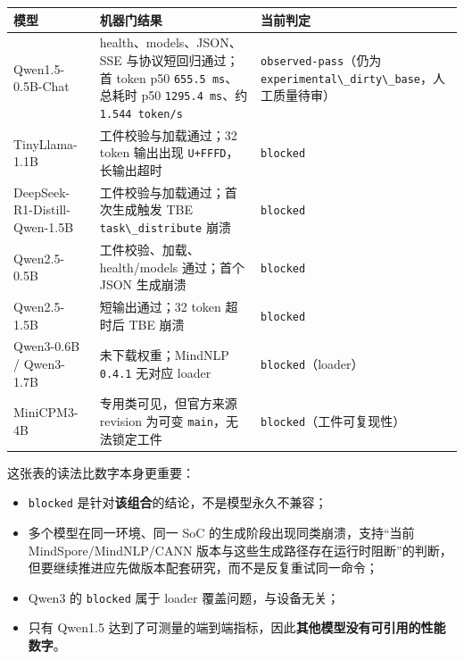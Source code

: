 \begin{longtable}[]{@{}
  >{\raggedright\arraybackslash}p{}
  >{\raggedright\arraybackslash}p{}
  >{\raggedright\arraybackslash}p{}@{}}
\toprule\noalign{}
\begin{minipage}[b]{\linewidth}\raggedright
模型
\end{minipage} & \begin{minipage}[b]{\linewidth}\raggedright
机器门结果
\end{minipage} & \begin{minipage}[b]{\linewidth}\raggedright
当前判定
\end{minipage} \\
\midrule\noalign{}
\endhead
\bottomrule\noalign{}
\endlastfoot
Qwen1.5-0.5B-Chat & health、models、JSON、SSE 与协议短回归通过；首 token
p50 \passthrough{\lstinline!655.5 ms!}、总耗时 p50
\passthrough{\lstinline!1295.4 ms!}、约
\passthrough{\lstinline!1.544 token/s!} &
\passthrough{\lstinline!observed-pass!}（仍为
\passthrough{\lstinline!experimental\_dirty\_base!}，人工质量待审） \\
TinyLlama-1.1B & 工件校验与加载通过；32 token 输出出现
\passthrough{\lstinline!U+FFFD!}，长输出超时 &
\passthrough{\lstinline!blocked!} \\
DeepSeek-R1-Distill-Qwen-1.5B & 工件校验与加载通过；首次生成触发 TBE
\passthrough{\lstinline!task\_distribute!} 崩溃 &
\passthrough{\lstinline!blocked!} \\
Qwen2.5-0.5B & 工件校验、加载、health/models 通过；首个 JSON 生成崩溃 &
\passthrough{\lstinline!blocked!} \\
Qwen2.5-1.5B & 短输出通过；32 token 超时后 TBE 崩溃 &
\passthrough{\lstinline!blocked!} \\
Qwen3-0.6B / Qwen3-1.7B & 未下载权重；MindNLP
\passthrough{\lstinline!0.4.1!} 无对应 loader &
\passthrough{\lstinline!blocked!}（loader） \\
MiniCPM3-4B & 专用类可见，但官方来源 revision 为可变
\passthrough{\lstinline!main!}，无法锁定工件 &
\passthrough{\lstinline!blocked!}（工件可复现性） \\
\end{longtable}

这张表的读法比数字本身更重要：

\begin{itemize}
\tightlist
\item
  \passthrough{\lstinline!blocked!}
  是针对\textbf{该组合}的结论，不是模型永久不兼容；
\item
  多个模型在同一环境、同一 SoC 的生成阶段出现同类崩溃，支持``当前
  MindSpore/MindNLP/CANN
  版本与这些生成路径存在运行时阻断''的判断，但要继续推进应先做版本配套研究，而不是反复重试同一命令；
\item
  Qwen3 的 \passthrough{\lstinline!blocked!} 属于 loader
  覆盖问题，与设备无关；
\item
  只有 Qwen1.5
  达到了可测量的端到端指标，因此\textbf{其他模型没有可引用的性能数字}。
\end{itemize}

